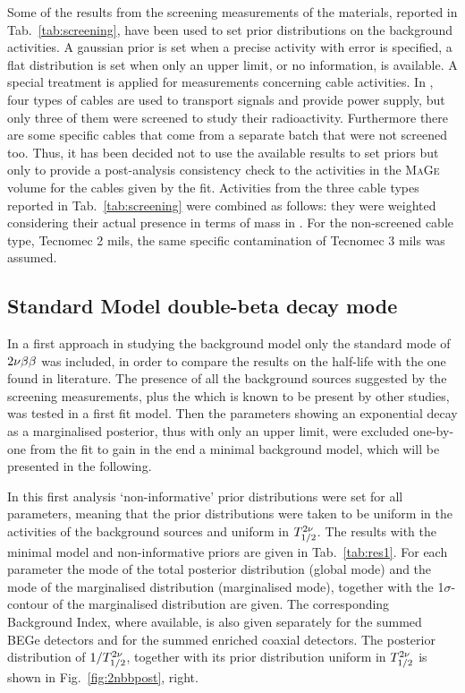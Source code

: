 Some of the results from the screening measurements of the materials, reported in Tab.~\ref{tab:screening}, have been used to set prior distributions on the background activities. A gaussian prior is set when a precise activity with error is specified, a flat distribution is set when only an upper limit, or no information, is available. A special treatment is applied for measurements concerning cable activities. In {\gerda}, four types of cables are used to transport signals and provide power supply, but only three of them were screened to study their radioactivity. Furthermore there are some specific cables that come from a separate batch that were not screened too. Thus, it has been decided not to use the available results to set priors but only to provide a post-analysis consistency check to the activities in the \textsc{MaGe} volume for the cables given by the fit. Activities from the three cable types reported in Tab.~\ref{tab:screening} were combined as follows: they were weighted considering their actual presence in terms of mass in {\gerda}. For the non-screened cable type, Tecnomec 2 mils, the same specific contamination of Tecnomec 3 mils was assumed.

\subsection*{Standard Model double-beta decay mode}
In a first approach in studying the background model only the standard mode of $2\nu\beta\beta$ was included, in order to compare the results on the half-life with the one found in literature. The presence of all the background sources suggested by the screening measurements, plus the  which is known to be present by other studies, was tested in a first fit model. Then the parameters showing an exponential decay as a marginalised posterior, thus with only an upper limit, were excluded one-by-one from the fit to gain in the end a minimal background model, which will be presented in the following.

 In this first analysis `non-informative' prior distributions were set for all parameters, meaning that the prior distributions were taken to be uniform in the activities of the background sources and uniform in $T_{1/2}^{2\nu}$. The results with the minimal model and non-informative priors are given in Tab.~\ref{tab:res1}. For each parameter the mode of the total posterior distribution (global mode) and the mode of the marginalised distribution (marginalised mode), together with the 1$\sigma$-contour of the marginalised distribution are given. The corresponding Background Index, where available, is also given separately for the summed BEGe detectors and for the summed enriched coaxial detectors. The posterior distribution of $1/T_{1/2}^{2\nu}$, together with its prior distribution uniform in $T_{1/2}^{2\nu}$ is shown in Fig.~\ref{fig:2nbbpost}, right.

